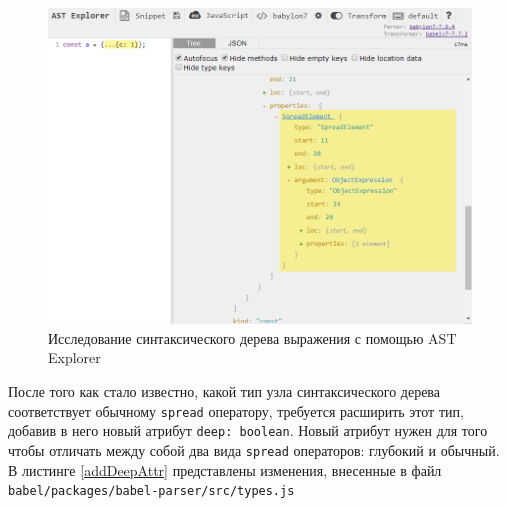 \documentclass[14pt, a4paper]{article}
\def\code#1{\texttt{#1}} %
\begin{document}
\begin{figure}[h!]
  \centering
  \includegraphics[scale=0.7]{img/ast-explorer.png}
  \caption{Исследование синтаксического дерева выражения с помощью AST Explorer}
  \label{ast_explorer}
\end{figure}

После того как стало известно, какой тип узла синтаксического дерева соответствует обычному \code{spread}
оператору, требуется расширить этот тип, добавив в него новый атрибут \code{deep: boolean}. Новый атрибут
нужен для того чтобы отличать между собой два вида \code{spread} операторов: глубокий и обычный. 
В листинге \ref{addDeepAttr} представлены изменения, внесенные в файл \code{babel/packages/babel-parser/src/types.js}





\end{document}
